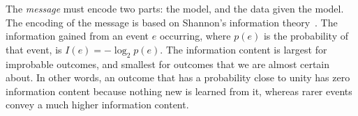 \documentclass{elsarticle}
\begin{document}

The \textit{message} must encode two parts: the model, and the data given the
model. The encoding of the message is based on Shannon's information theory~\cite{Shannon:1948}. 
The information gained from an event $e$ occurring, where $p(e)$ is the
probability of that event, is $I(e) = -\log_{2}{p(e)}$. The information content
is largest for improbable outcomes, and smallest for outcomes that we are 
almost certain about. In other words, an outcome that has a probability close
to unity has zero information content because nothing new is learned from it,
whereas rarer events convey a much higher information content.


\end{document}
